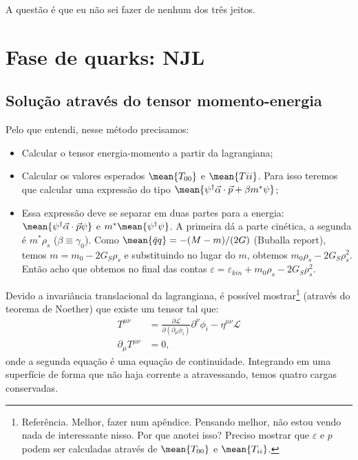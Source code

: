 A questão é que eu não sei fazer de nenhum dos três jeitos.

\section{Fase de quarks: NJL}

\subsection{Solução através do tensor momento-energia}

Pelo que entendi, nesse método precisamos:
\begin{itemize}
	\item Calcular o tensor energia-momento a partir da lagrangiana;
	\item Calcular os valores esperados $\mean{T_{00}}$ e $\mean{T{ii}}$. Para isso teremos que calcular uma expressão do tipo $\mean{\psi^\dagger \vec{\alpha}\cdot\vec{p} + \beta m^*\psi}$;
	\item Essa expressão deve se separar em duas partes para a energia: $\mean{\psi^\dagger\vec{\alpha}\cdot\vec{p}\psi}$ e $m^*\mean{\psi^\dagger\psi}$. A primeira dá a parte cinética, a segunda é $m^* \rho_s$ ($\beta \equiv \gamma_0$). Como $\mean{\bar{q}q} = -(M - m)/(2G)$ (Buballa report), temos $m = m_0 - 2G_S\rho_s$ e substituindo no lugar do $m$, obtemos $m_0\rho_s - 2G_S\rho_s^2$. Então acho que obtemos no final das contas $\varepsilon = \varepsilon_{kin} + m_0\rho_s - 2G_S\rho_s^2$.
\end{itemize}

Devido a invariância translacional da lagrangiana, é possível mostrar\footnote{Referência. Melhor, fazer num apêndice. Pensando melhor, não estou vendo nada de interessante nisso. Por que anotei isso? Preciso mostrar que $\varepsilon$ e $p$ podem ser calculadas através de $\mean{T_{00}}$ e $\mean{T_{ii}}$.} (através do teorema de Noether) que existe um tensor tal que:
\begin{align}
	T^{\mu\nu} &= \frac{\partial \mathcal{L}}{\partial(\partial_\mu \phi_i)}\partial^\nu\phi_i - \eta^{\mu\nu}\mathcal{L} \\
	\partial_\mu T^{\mu\nu} &= 0,
\end{align}
%
onde a segunda equação é uma equação de continuidade. Integrando em uma superfície de forma que não haja corrente a atravessando, temos quatro cargas conservadas.

